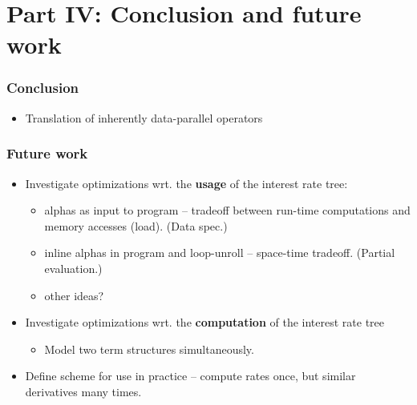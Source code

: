 \section{Part IV: Conclusion and future work}

\begin{frame}
  \frametitle{Conclusion}
%
\begin{itemize}
  \item Translation of inherently data-parallel operators
\end{itemize}
%
\end{frame}


\begin{frame}
  \frametitle{Future work}
  \begin{itemize}
  \item Investigate optimizations wrt. the \textbf{usage} of
    the interest rate tree:
    \begin{itemize}
      \item alphas as input to program -- tradeoff between
        run-time computations and memory accesses (load). (Data spec.)
      \item inline alphas in program and loop-unroll --
        space-time tradeoff. (Partial evaluation.)
      \item other ideas?
    \end{itemize}
  \item Investigate optimizations wrt. the
    \textbf{computation} of the interest rate tree
    \begin{itemize}
    \item Model two term structures simultaneously.
    \end{itemize}
  \item Define scheme for use in practice -- compute rates
    once, but similar derivatives many times.
  \end{itemize}
\end{frame}
